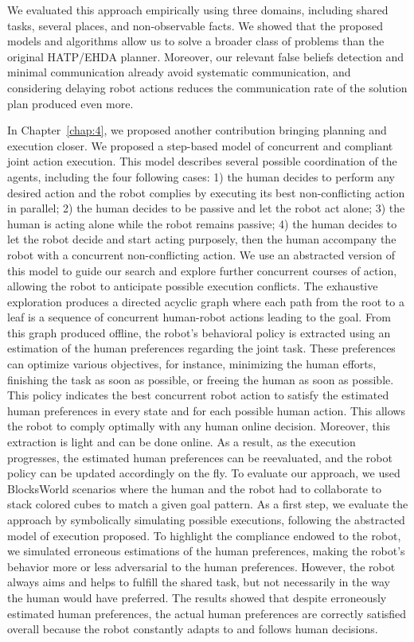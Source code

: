 We evaluated this approach empirically using three domains, including shared tasks, several places, and non-observable facts. We showed that the proposed models and algorithms allow us to solve a broader class of problems than the original HATP/EHDA planner. Moreover, our relevant false beliefs detection and minimal communication already avoid systematic communication, and considering delaying robot actions reduces the communication rate of the solution plan produced even more. 


In Chapter~\ref{chap:4}, we proposed another contribution bringing planning and execution closer. We proposed a step-based model of concurrent and compliant joint action execution. 
This model describes several possible coordination of the agents, including the four following cases: 1) the human decides to perform any desired action and the robot complies by executing its best non-conflicting action in parallel; 2) the human decides to be passive and let the robot act alone; 3) the human is acting alone while the robot remains passive; 4) the human decides to let the robot decide and start acting purposely, then the human accompany the robot with a concurrent non-conflicting action.
We use an abstracted version of this model to guide our search and explore further concurrent courses of action, allowing the robot to anticipate possible execution conflicts. 
The exhaustive exploration produces a directed acyclic graph where each path from the root to a leaf is a sequence of concurrent human-robot actions leading to the goal. From this graph produced offline, the robot's behavioral policy is extracted using an estimation of the human preferences regarding the joint task. These preferences can optimize various objectives, for instance, minimizing the human efforts, finishing the task as soon as possible, or freeing the human as soon as possible.  
This policy indicates the best concurrent robot action to satisfy the estimated human preferences in every state and for each possible human action. This allows the robot to comply optimally with any human online decision.  
Moreover, this extraction is light and can be done online. As a result, as the execution progresses, the estimated human preferences can be reevaluated, and the robot policy can be updated accordingly on the fly.
To evaluate our approach, we used BlocksWorld scenarios where the human and the robot had to collaborate to stack colored cubes to match a given goal pattern. 
As a first step, we evaluate the approach by symbolically simulating possible executions, following the abstracted model of execution proposed. To highlight the compliance endowed to the robot, we simulated erroneous estimations of the human preferences, making the robot's behavior more or less adversarial to the human preferences. However, the robot always aims and helps to fulfill the shared task, but not necessarily in the way the human would have preferred. The results showed that despite erroneously estimated human preferences, the actual human preferences are correctly satisfied overall because the robot constantly adapts to and follows human decisions. 
